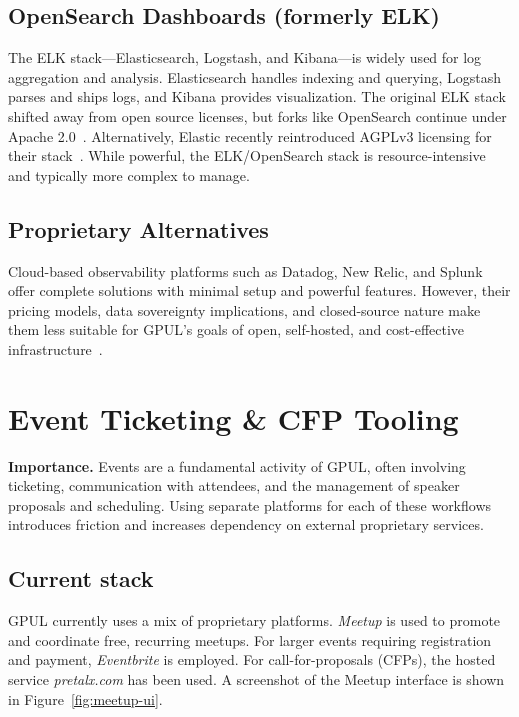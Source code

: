 \subsection{OpenSearch Dashboards (formerly ELK)}
The ELK stack—Elasticsearch, Logstash, and Kibana—is widely used for log aggregation and analysis. Elasticsearch handles indexing and querying, Logstash parses and ships logs, and Kibana provides visualization. The original ELK stack shifted away from open source licenses, but forks like OpenSearch continue under Apache 2.0~\cite{opensearch_web}. Alternatively, Elastic recently reintroduced AGPLv3 licensing for their stack~\cite{elastic_license}. While powerful, the ELK/OpenSearch stack is resource-intensive and typically more complex to manage.

\subsection{Proprietary Alternatives}
Cloud-based observability platforms such as Datadog, New Relic, and Splunk offer complete solutions with minimal setup and powerful features. However, their pricing models, data sovereignty implications, and closed-source nature make them less suitable for GPUL's goals of open, self-hosted, and cost-effective infrastructure~\cite{datadog_web}.

\section{Event Ticketing \& CFP Tooling}

\textbf{Importance.} Events are a fundamental activity of GPUL, often involving ticketing, communication with attendees, and the management of speaker proposals and scheduling. Using separate platforms for each of these workflows introduces friction and increases dependency on external proprietary services.

\subsection{Current stack}
GPUL currently uses a mix of proprietary platforms. \emph{Meetup} is used to promote and coordinate free, recurring meetups. For larger events requiring registration and payment, \emph{Eventbrite} is employed. For call-for-proposals (CFPs), the hosted service \emph{pretalx.com} has been used. A screenshot of the Meetup interface is shown in Figure~\ref{fig:meetup-ui}.

